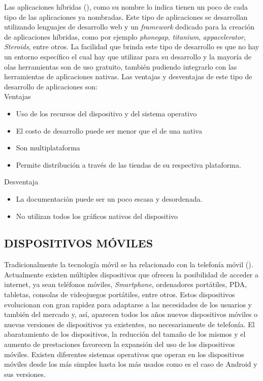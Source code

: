Las aplicaciones híbridas (\cite{MT-11}), como su nombre lo indica tienen un poco de cada tipo de las aplicaciones ya nombradas. Este tipo de aplicaciones se desarrollan utilizando lenguajes de desarrollo web y un \textit{framework} dedicado para la creación de aplicaciones híbridas, como por ejemplo \textit{phonegap}, \textit{titanium}, \textit{appacelerator}, \textit{Steroids}, entre otros. La facilidad que brinda este tipo de desarrollo es que no hay un entorno específico el cual hay que utilizar para su desarrollo y la mayoría de olas herramientas son de uso gratuito, también pudiendo integrarlo con las herramientas de aplicaciones nativas. Las ventajas y desventajas de este tipo de desarrollo de aplicaciones son:\\

Ventajas
\begin{itemize}
\item  Uso de los recursos del dispositivo y del sistema operativo
\item  El costo de desarrollo puede ser menor que el de una nativa
\item  Son multiplataforma
\item  Permite distribución a través de las tiendas de su respectiva plataforma.
\end{itemize}
Desventaja
\begin{itemize}
\item  La documentación puede ser un poco escasa y desordenada.
\item  No utilizan todos los gráficos nativos del dispositivo
\end{itemize}


\subsection{DISPOSITIVOS MÓVILES}


Tradicionalmente la tecnología móvil se ha relacionado con la telefonía móvil (\cite{MT-12}). Actualmente existen múltiples dispositivos que ofrecen la posibilidad de acceder a internet, ya sean teléfonos móviles, \textit{Smartphone}, ordenadores portátiles, PDA, tabletas, consolas de videojuegos portátiles, entre otros. Estos dispositivos evolucionan con gran rapidez para adaptarse a las necesidades de los usuarios y también del mercado y, así, aparecen todos los años nuevos dispositivos móviles o nuevas versiones de dispositivos ya existentes, no necesariamente de telefonía. El abaratamiento de los dispositivos, la reducción del tamaño de los mismos y el aumento de prestaciones favorecen la expansión del uso de los dispositivos móviles.  Existen diferentes sistemas operativos que operan en los dispositivos móviles desde los más simples hasta los más usados como es el caso de Android  y sus versiones.

